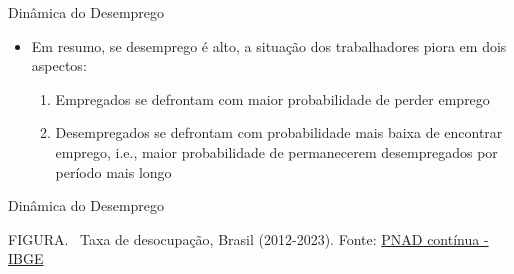 \documentclass[10pt]{beamer}
\begin{document}
\begin{frame}{Dinâmica do Desemprego}
    \begin{itemize}
        \item Em resumo, se desemprego é alto, a situação dos trabalhadores piora em dois aspectos:\bigskip
        \begin{enumerate}
            \item Empregados se defrontam com maior probabilidade de perder emprego\medskip
            \item Desempregados se defrontam com probabilidade mais baixa de encontrar emprego, i.e., maior probabilidade de permanecerem desempregados por período mais longo
        \end{enumerate}
    \end{itemize}
\end{frame}

\begin{frame}{Dinâmica do Desemprego}
    \begin{center}
		\begin{minipage}[b]{.8\textwidth}
			\tiny{{\scshape FIGURA}. \ Taxa de desocupação, Brasil (2012-2023). Fonte: \href{https://www.ibge.gov.br/estatisticas/sociais/trabalho/9173-pesquisa-nacional-por-amostra-de-domicilios-continua-trimestral.html?=&t=series-historicas&utm_source=landing&utm_medium=explica&utm_campaign=desemprego}{PNAD contínua - IBGE}} 
		\end{minipage}
	\end{center}
\end{frame}
\end{document}
